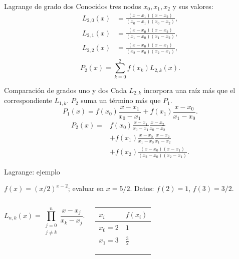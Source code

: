 \documentclass[main.tex]{subfiles}
\begin{document}
\begin{frame}[t]{Lagrange de grado dos}
\small Conocidos tres nodos $x_0,x_1,x_2$ y sus valores:\begin{align*}L_{2,0}(x)&=\frac{(x-x_1)(x-x_2)}{(x_0-x_1)(x_0-x_2)},\\L_{2,1}(x)&=\frac{(x-x_0)(x-x_2)}{(x_1-x_0)(x_1-x_2)},\\L_{2,2}(x)&=\frac{(x-x_0)(x-x_1)}{(x_2-x_0)(x_2-x_1)},\\\end{align*}\[P_2(x)=\sum_{k=0}^2f(x_k)L_{2,k}(x).\]
\end{frame}
\begin{frame}[t]{Comparación de grados uno y dos}
\small Cada $L_{2,k}$ incorpora una raíz más que el correspondiente $L_{1,k}$. $P_2$ suma un término más que $P_1$.
\[P_1(x)=f(x_0)\frac{x-x_1}{x_0-x_1}+f(x_1)\frac{x-x_0}{x_1-x_0}.\]
\begin{align*}
P_2(x)={}&f(x_0)\frac{x-x_1}{x_0-x_1}\frac{x-x_2}{x_0-x_2}\\
&+f(x_1)\frac{x-x_0}{x_1-x_0}\frac{x-x_2}{x_1-x_2}\\
&+f(x_2)\frac{(x-x_0)(x-x_1)}{(x_2-x_0)(x_2-x_1)}.
\end{align*}
\end{frame}
\begin{frame}[t]{Lagrange: ejemplo}
\par\noindent\begin{minipage}[t][7.5mm][t]{\textwidth}\small\strut $f(x)=(x/2)^{x-2}$; evaluar en $x=5/2$. Datos: $f(2)=1$, $f(3)=3/2$.\end{minipage}\par\nointerlineskip
\begin{columns}[T]\small\setlength{\abovedisplayskip}{4pt}\setlength{\belowdisplayskip}{4pt}\[L_{n,k}(x)=\prod_{\substack{j=0\\j\ne k}}^n\frac{x-x_j}{x_k-x_j}.\]\begingroup\small\setlength{\tabcolsep}{3pt}\begin{center}\begin{tabular}{|C{.42\textwidth}|C{.42\textwidth}|}\hline
\rule[-2mm]{0pt}{6mm}$x_i$&$f(x_i)$\\\hline
\rule[-2.5mm]{0pt}{6mm}$x_0=2$&$1$\\\hline
\rule[-2.5mm]{0pt}{6mm}$x_1=3$&$\frac{3}{2}$\\\hline
\rule[-2.5mm]{0pt}{6mm}&\\\hline
\rule[-2.5mm]{0pt}{6mm}&\\\hline
\rule[-2.5mm]{0pt}{6mm}&\\\hline
\end{tabular}\end{center}\endgroup\par
\end{columns}
\end{frame}
\end{document}
